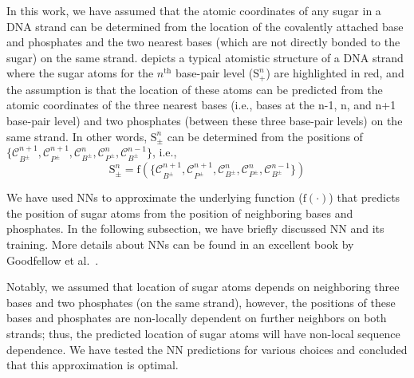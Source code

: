 In this work, we have assumed that the atomic coordinates of any sugar in a DNA strand can be determined from the location of the covalently attached base and phosphates and the two nearest bases (which are not directly bonded to the sugar) on the same strand. 
 depicts a typical atomistic structure of a DNA strand where the sugar atoms for the $n^\text{th}$ base-pair level ($\mathrm{S}_+^n$) are highlighted in red, and the assumption is that the location of these atoms can be predicted from the atomic coordinates of the three nearest bases (i.e., bases at the n-1, n, and n+1 base-pair level) and two phosphates (between these three base-pair levels) on the same strand. 
In other words, $\mathrm{S}_\pm^n$ can be determined from the positions of $\{\mathcal{C}_{B^\pm}^{n+1},\mathcal{C}_{P^\pm}^{n+1},\mathcal{C}_{B^\pm}^n,\mathcal{C}_{P^\pm}^n,\mathcal{C}_{B^\pm}^{n-1}\}$, i.e., 
\begin{equation}
\mathrm{S}_\pm^n = \mathrm{f}\left(\{\mathcal{C}_{B^\pm}^{n+1},\mathcal{C}_{P^\pm}^{n+1},\mathcal{C}_{B^\pm}^n,\mathcal{C}_{P^\pm}^n,\mathcal{C}_{B^\pm}^{n-1}\}\right)
\label{c7:eq_NN_function}    
\end{equation}

We have used NNs to approximate the underlying function ($\mathrm{f}(\cdot)$) that predicts the position of sugar atoms from the position of neighboring bases and phosphates.
In the following subsection, we have briefly discussed NN and its training. 
More details about NNs can be found in an excellent book by Goodfellow et al.~\cite{goodfellow2016deep}. 

Notably, we assumed that location of sugar atoms depends on neighboring three bases and two phosphates (on the same strand), however, the positions of these bases and phosphates are non-locally dependent on further neighbors on both strands; thus, the predicted location of sugar atoms will have non-local sequence dependence.
We have tested the NN predictions for various choices and concluded that this approximation is optimal.

